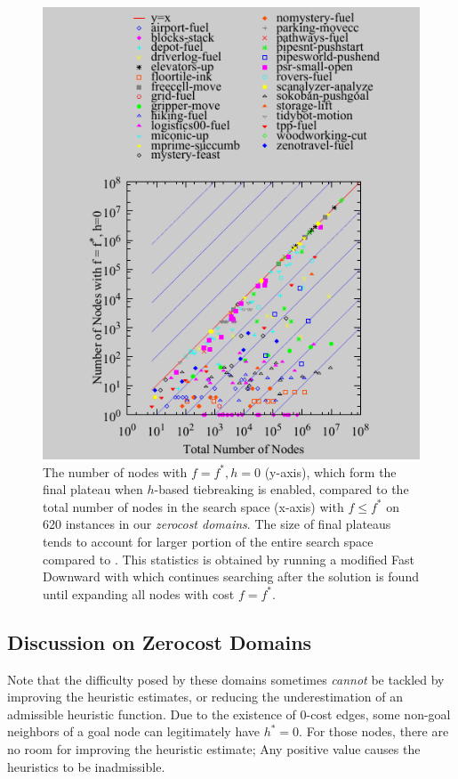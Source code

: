 \begin{figure}[htbp]
  \centering
  \includegraphics{tables/aaai16-frontier/zerocost/lmcut_frontier-front.pdf}
  \caption{
 The number of nodes with $f=f^*, h=0$ (y-axis), which form
  the final plateau when $h$-based tiebreaking is enabled, compared to
 the total number of nodes in the search space (x-axis) with
 $f\leq f^*$ on 620 instances in our \emph{zerocost domains}.
 The size of final plateaus tends to account for larger portion of the
 entire search space compared to .
 This statistics is obtained by running a modified Fast Downward with
 \lmcut which continues searching after the solution is found
 until expanding all nodes with cost $f=f^*$.
 }
 \label{fig:plateau-zerocost}
\end{figure}

\subsection{Discussion on Zerocost Domains}

Note that the difficulty posed by these domains sometimes \emph{cannot}
be tackled by improving the heuristic estimates, or reducing the
underestimation of an admissible heuristic function.  Due to the
existence of 0-cost edges, some non-goal neighbors of a goal node can
legitimately have $h^*=0$. For those nodes,
there are no room for improving the heuristic estimate; Any positive
value causes the heuristics to be inadmissible.

